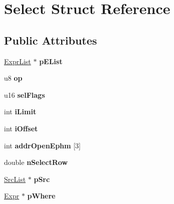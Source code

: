 \hypertarget{struct_select}{\section{Select Struct Reference}
\label{struct_select}
}
\subsection*{Public Attributes}
\begin{DoxyCompactItemize}
\item 
\hypertarget{struct_select_acf92c5d6b0e0e6a3263a77696baaadc8}{\hyperlink{struct_expr_list}{Expr\-List} $\ast$ {\bfseries p\-E\-List}}\label{struct_select_acf92c5d6b0e0e6a3263a77696baaadc8}

\item 
\hypertarget{struct_select_a84506d61248313b5e10f7891cb7482be}{u8 {\bfseries op}}\label{struct_select_a84506d61248313b5e10f7891cb7482be}

\item 
\hypertarget{struct_select_a1c445561ea66d48573c8d8751108c743}{u16 {\bfseries sel\-Flags}}\label{struct_select_a1c445561ea66d48573c8d8751108c743}

\item 
\hypertarget{struct_select_abf68908bf029af42a32c60a2558a8b1e}{int {\bfseries i\-Limit}}\label{struct_select_abf68908bf029af42a32c60a2558a8b1e}

\item 
\hypertarget{struct_select_ac12bebd00ed988df3ad1efb8e6c63fe4}{int {\bfseries i\-Offset}}\label{struct_select_ac12bebd00ed988df3ad1efb8e6c63fe4}

\item 
\hypertarget{struct_select_a5cad3b59bf1803be552d002e74bdfd47}{int {\bfseries addr\-Open\-Ephm} \mbox{[}3\mbox{]}}\label{struct_select_a5cad3b59bf1803be552d002e74bdfd47}

\item 
\hypertarget{struct_select_a177125317478139f9ce834e4f7a93c52}{double {\bfseries n\-Select\-Row}}\label{struct_select_a177125317478139f9ce834e4f7a93c52}

\item 
\hypertarget{struct_select_a4e3b9b176a8e1b4af988405ff1f090db}{\hyperlink{struct_src_list}{Src\-List} $\ast$ {\bfseries p\-Src}}\label{struct_select_a4e3b9b176a8e1b4af988405ff1f090db}

\item 
\hypertarget{struct_select_a0562c1e19acde263a04af015611d8ce8}{\hyperlink{struct_expr}{Expr} $\ast$ {\bfseries p\-Where}}\label{struct_select_a0562c1e19acde263a04af015611d8ce8}


\end{DoxyCompactItemize}
